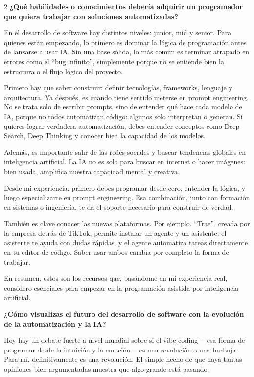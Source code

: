 \documentclass[12pt,spanish,Letterpaper,openany]{book}
\begin{document}
\begin {multicols}{2}
\textbf{¿Qué habilidades o conocimientos debería adquirir un programador que quiera trabajar con soluciones automatizadas?}

En el desarrollo de software hay distintos niveles: junior, mid y senior. Para quienes están empezando, lo primero es dominar la lógica de programación antes de lanzarse a usar IA. Sin una base sólida, lo más común es terminar atrapado en errores como el ``bug infinito'', simplemente porque no se entiende bien la estructura o el flujo lógico del proyecto.

Primero hay que saber construir: definir tecnologías, frameworks, lenguaje y arquitectura. Ya después, es cuando tiene sentido meterse en prompt engineering. No se trata solo de escribir prompts, sino de entender qué hace cada modelo de IA, porque no todos automatizan código: algunos solo interpretan o generan. Si quieres lograr verdadera automatización, debes entender conceptos como Deep Search, Deep Thinking y conocer bien la capacidad de los modelos.

Además, es importante salir de las redes sociales y buscar tendencias globales en inteligencia artificial. La IA no es solo para buscar en internet o hacer imágenes: bien usada, amplifica nuestra capacidad mental y creativa.

Desde mi experiencia, primero debes programar desde cero, entender la lógica, y luego especializarte en prompt engineering. Esa combinación, junto con formación en sistemas o ingeniería, te da el soporte necesario para construir de verdad.

También es clave conocer las nuevas plataformas. Por ejemplo, ``Trae'', creada por la empresa detrás de TikTok, permite instalar un agente y un asistente: el asistente te ayuda con dudas rápidas, y el agente automatiza tareas directamente en tu editor de código. Saber usar ambos cambia por completo la forma de trabajar.

En resumen, estos son los recursos que, basándome en mi experiencia real, considero esenciales para empezar en la programación asistida por inteligencia artificial.

\textbf{¿Cómo visualizas el futuro del desarrollo de software con la evolución de la automatización y la IA?}

Hoy hay un debate fuerte a nivel mundial sobre si el vibe coding ---esa forma de programar desde la intuición y la emoción--- es una revolución o una burbuja. Para mí, definitivamente es una revolución. El simple hecho de que haya tantas opiniones bien argumentadas muestra que algo grande está pasando.


\end{multicols}
\end{document}
